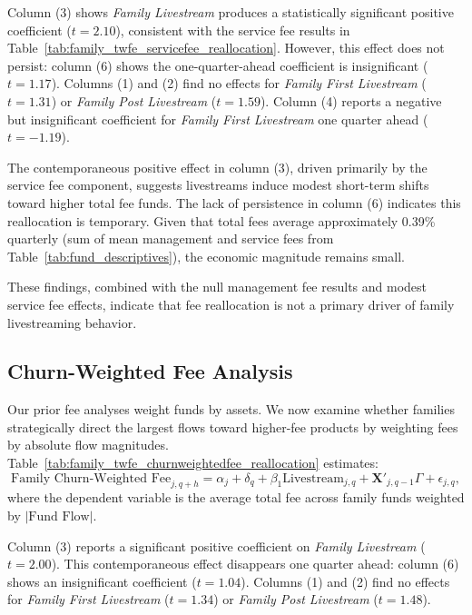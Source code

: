 \documentclass[12pt]{article}
\begin{document}
Column (3) shows \textit{Family Livestream} produces a statistically significant positive coefficient ($t = 2.10$), consistent with the service fee results in Table~\ref{tab:family_twfe_servicefee_reallocation}. However, this effect does not persist: column (6) shows the one-quarter-ahead coefficient is insignificant ($t = 1.17$). Columns (1) and (2) find no effects for \textit{Family First Livestream} ($t = 1.31$) or \textit{Family Post Livestream} ($t = 1.59$). Column (4) reports a negative but insignificant coefficient for \textit{Family First Livestream} one quarter ahead ($t = -1.19$).

The contemporaneous positive effect in column (3), driven primarily by the service fee component, suggests livestreams induce modest short-term shifts toward higher total fee funds. The lack of persistence in column (6) indicates this reallocation is temporary. Given that total fees average approximately 0.39\% quarterly (sum of mean management and service fees from Table~\ref{tab:fund_descriptives}), the economic magnitude remains small.

These findings, combined with the null management fee results and modest service fee effects, indicate that fee reallocation is not a primary driver of family livestreaming behavior.

\subsection{Churn-Weighted Fee Analysis}\label{subsec:churn_weighted_fee}

Our prior fee analyses weight funds by assets. We now examine whether families strategically direct the largest flows toward higher-fee products by weighting fees by absolute flow magnitudes. Table~\ref{tab:family_twfe_churnweightedfee_reallocation} estimates:
\begin{equation}
    \label{eq:family_churn_fee}
    \text{Family Churn-Weighted Fee}_{j,q+h} = \alpha_j + \delta_q + \beta_1 \text{Livestream}_{j,q} + \mathbf{X}'_{j,q-1} \Gamma + \epsilon_{j,q},
\end{equation}
where the dependent variable is the average total fee across family funds weighted by $|\text{Fund Flow}|$.

Column (3) reports a significant positive coefficient on \textit{Family Livestream} ($t = 2.00$). This contemporaneous effect disappears one quarter ahead: column (6) shows an insignificant coefficient ($t = 1.04$). Columns (1) and (2) find no effects for \textit{Family First Livestream} ($t = 1.34$) or \textit{Family Post Livestream} ($t = 1.48$).
\end{document}
